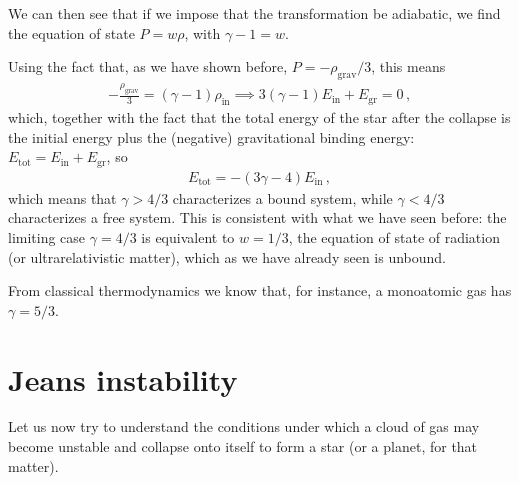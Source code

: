 \documentclass[main.tex]{subfiles}
\begin{document}
We can then see that if we impose that the transformation be adiabatic, we find the equation of state \(P  =w \rho \), with \(\gamma -1 = w\). 


Using the fact that, as we have shown before, \(P = - \rho _{\text{grav}} / 3\), this means 
%
\begin{align}
- \frac{\rho _{\text{grav}}}{3} = (\gamma - 1) \rho _{\text{in}} \implies
  3(\gamma -1 ) E _{\text{in}} + E _{\text{gr}} = 0
\,,
\end{align}
%
which, together with the fact that the total energy of the star after the collapse is the initial energy plus the (negative) gravitational binding energy: \(E _{\text{tot}} = E _{\text{in}} + E _{\text{gr}}\), so 
%
\begin{align}
  E _{\text{tot}} = - (3 \gamma - 4) E _{\text{in}}
\,,
\end{align}
%
which means that \(\gamma > 4/3\) characterizes a bound system, while \(\gamma < 4/3\) characterizes a free system. 
This is consistent with what we have seen before: the limiting case \(\gamma = 4/3\) is equivalent to \(w = 1/3\), the equation of state of radiation (or ultrarelativistic matter), which as we have already seen is unbound.

From classical thermodynamics we know that, for instance, a monoatomic gas has \(\gamma = 5 /3\).


\section{Jeans instability}

% 
Let us now try to understand the conditions under which a cloud of gas may become unstable and collapse onto itself to form a star (or a planet, for that matter). 
\end{document}
